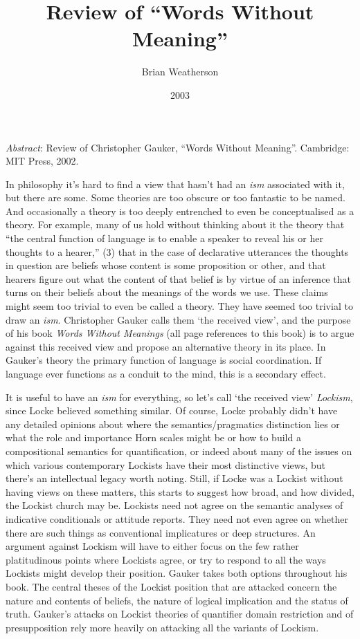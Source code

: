 \documentclass[
  11pt,
  letterpaper,
  DIV=11,
  numbers=noendperiod,
  twoside]{scrartcl}
\title{Review of ``Words Without Meaning''}
\author{Brian Weatherson}
\date{2003}
\renewenvironment{abstract}
 {\vspace{-1.25cm}
 \quotation\small\noindent\emph{Abstract}:}
 {\endquotation}
\renewenvironment{abstract}
 {\quotation\small\noindent\emph{Abstract}:}
 {\endquotation\vspace{-0.02cm}}
\begin{document}
\maketitle
\begin{abstract}
Review of Christopher Gauker, ``Words Without Meaning''. Cambridge: MIT
Press, 2002.
\end{abstract}


In philosophy it's hard to find a view that hasn't had an \emph{ism}
associated with it, but there are some. Some theories are too obscure or
too fantastic to be named. And occasionally a theory is too deeply
entrenched to even be conceptualised as a theory. For example, many of
us hold without thinking about it the theory that ``the central function
of language is to enable a speaker to reveal his or her thoughts to a
hearer,'' (3) that in the case of declarative utterances the thoughts in
question are beliefs whose content is some proposition or other, and
that hearers figure out what the content of that belief is by virtue of
an inference that turns on their beliefs about the meanings of the words
we use. These claims might seem too trivial to even be called a theory.
They have seemed too trivial to draw an \emph{ism}. Christopher Gauker
calls them `the received view', and the purpose of his book \emph{Words
Without Meanings} (all page references to this book) is to argue against
this received view and propose an alternative theory in its place. In
Gauker's theory the primary function of language is social coordination.
If language ever functions as a conduit to the mind, this is a secondary
effect.

It is useful to have an \emph{ism} for everything, so let's call `the
received view' \emph{Lockism}, since Locke believed something similar.
Of course, Locke probably didn't have any detailed opinions about where
the semantics/pragmatics distinction lies or what the role and
importance Horn scales might be or how to build a compositional
semantics for quantification, or indeed about many of the issues on
which various contemporary Lockists have their most distinctive views,
but there's an intellectual legacy worth noting. Still, if Locke was a
Lockist without having views on these matters, this starts to suggest
how broad, and how divided, the Lockist church may be. Lockists need not
agree on the semantic analyses of indicative conditionals or attitude
reports. They need not even agree on whether there are such things as
conventional implicatures or deep structures. An argument against
Lockism will have to either focus on the few rather platitudinous points
where Lockists agree, or try to respond to all the ways Lockists might
develop their position. Gauker takes both options throughout his book.
The central theses of the Lockist position that are attacked concern the
nature and contents of beliefs, the nature of logical implication and
the status of truth. Gauker's attacks on Lockist theories of quantifier
domain restriction and of presupposition rely more heavily on attacking
all the variants of Lockism.
\end{document}
